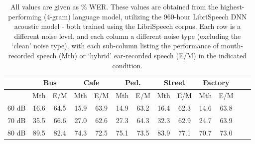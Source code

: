 \begin{table}[h]
\begin{center}
\begin{tabular}{| c || c | c | c | c | c | c | c | c | c | c | c | c |} \hline
      & \multicolumn{2}{|c|}{Bus} & \multicolumn{2}{|c|}{Cafe} & \multicolumn{2}{|c|}{Ped.} & \multicolumn{2}{|c|}{Street} & \multicolumn{2}{|c|}{Factory} \\ \hline
      & Mth & E/M & Mth & E/M & Mth & E/M & Mth & E/M & Mth & E/M \\ \hline\hline
60 dB & 16.6 & 64.5 & 15.9 & 63.9 & 14.9 & 63.2 & 16.4 & 62.3 & 14.6 & 63.8  \\ \hline
70 dB & 35.5 & 66.6 & 27.0 & 62.6 & 27.3 & 64.3 & 32.3 & 62.9 & 24.7 & 63.9  \\ \hline
80 dB & 89.5 & 82.4 & 74.3 & 72.5 & 75.1 & 73.5 & 83.9 & 77.1 & 70.7 & 73.0  \\ \hline
\end{tabular}
\end{center}
\caption{All values are given as \% WER. These values are obtained from the highest-performing (4-gram) language model, utilizing the 960-hour LibriSpeech DNN acoustic model - both trained using the LibriSpeech corpus.  Each row is a different noise level, and each column a different noise type (excluding the `clean' noise type), with each sub-column listing the performance of mouth-recorded speech (Mth) or `hybrid' ear-recorded speech (E/M) in the indicated condition.}\label{tab:hybrid-wers}
\end{table}
% 
% 
